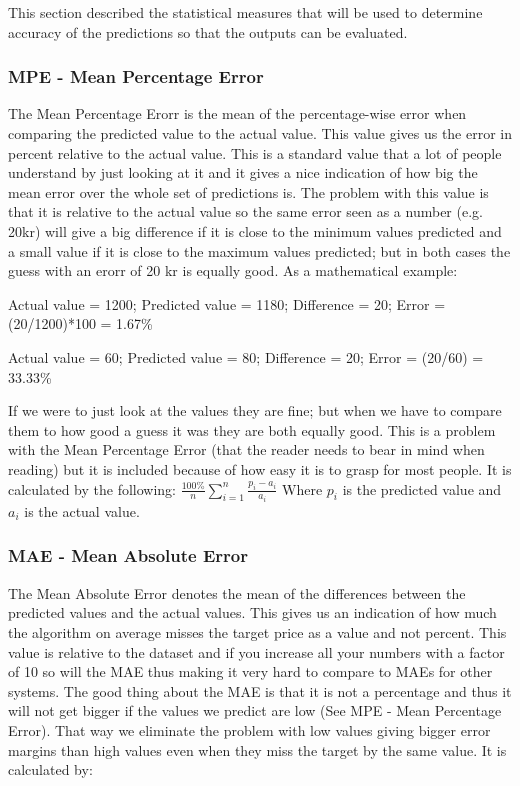 This section described the statistical measures that will be used to determine accuracy of the predictions so that the outputs can be evaluated.

\subsubsection{MPE - Mean Percentage Error}
The Mean Percentage Erorr is the mean of the percentage-wise error when comparing the predicted value to the actual value. This value gives us the error in percent relative to the actual value. This is a standard value that a lot of people understand by just looking at it and it gives a nice indication of how big the mean error over the whole set of predictions is. The problem with this value is that it is relative to the actual value so the same error seen as a number (e.g. 20kr) will give a big difference if it is close to the minimum values predicted and a small value if it is close to the maximum values predicted; but in both cases the guess with an erorr of 20 kr is equally good. As a mathematical example:

Actual value = 1200; Predicted value = 1180; Difference = 20; Error = (20/1200)*100 = 1.67\% 

Actual value = 60; Predicted value = 80; Difference = 20; Error = (20/60) = 33.33\%

If we were to just look at the values they are fine; but when we have to compare them to how good a guess it was they are both equally good. This is a problem with the Mean Percentage Error (that the reader needs to bear in mind when reading) but it is included because of how easy it is to grasp for most people.
It is calculated by the following:
$ \frac{100\%}{n}\sum_{i=1}^{n}\frac{p_i - a_i}{a_i} $
Where $p_i$ is the predicted value and $a_i$ is the actual value.
\subsubsection{MAE - Mean Absolute Error}
\label{sec:maeStatistics}
The Mean Absolute Error denotes the mean of the differences between the predicted values and the actual values. This gives us an indication of how much the algorithm on average misses the target price as a value and not percent. This value is relative to the dataset and if you increase all your numbers with a factor of 10 so will the MAE thus making it very hard to compare to MAEs for other systems. The good thing about the MAE is that it is not a percentage and thus it will not get bigger if the values we predict are low (See MPE - Mean Percentage Error). That way we eliminate the problem with low values giving bigger error margins than high values even when they miss the target by the same value. It is calculated by:


